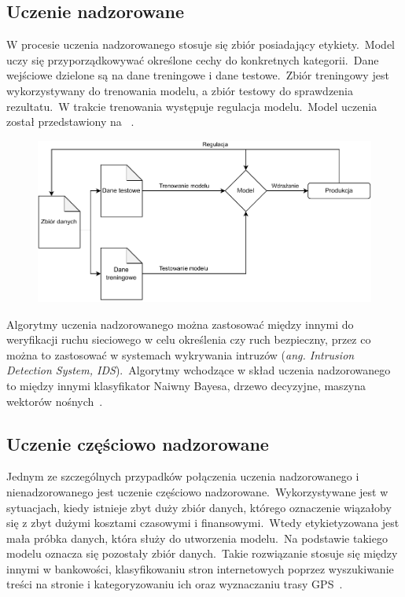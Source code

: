 \subsection{Uczenie nadzorowane}
W procesie uczenia nadzorowanego stosuje się zbiór posiadający etykiety.\ Model uczy się przyporządkowywać określone cechy do konkretnych kategorii.\ Dane wejściowe dzielone są na dane treningowe i dane testowe.\ Zbiór treningowy jest wykorzystywany do trenowania modelu, a zbiór testowy do sprawdzenia rezultatu.\ W trakcie trenowania występuje regulacja modelu.\ Model uczenia został przedstawiony na ~\cite{AiScience, Mahesh2018}.

\begin{figure}[H]
    \centering
    \includegraphics[width=1\textwidth]{images/supervised}
    \label{fig:spervised}
\end{figure}

Algorytmy uczenia nadzorowanego można zastosować między innymi do weryfikacji ruchu sieciowego w celu określenia czy ruch bezpieczny, przez co można to zastosować w systemach wykrywania intruzów (\textit{ang. Intrusion Detection System, IDS}).\ Algorytmy wchodzące w skład uczenia nadzorowanego to między innymi klasyfikator Naiwny Bayesa, drzewo decyzyjne, maszyna wektorów nośnych~\cite{AiScience, Mahesh2018}.

\subsection{Uczenie częściowo nadzorowane}
Jednym ze szczególnych przypadków połączenia uczenia nadzorowanego i nienadzorowanego jest uczenie częściowo nadzorowane.\ Wykorzystywane jest w sytuacjach, kiedy istnieje zbyt duży zbiór danych, którego oznaczenie wiązałoby się z zbyt dużymi kosztami czasowymi i finansowymi.\ Wtedy etykietyzowana jest mała próbka danych, która służy do utworzenia modelu.\ Na podstawie takiego modelu oznacza się pozostały zbiór danych.\ Takie rozwiązanie stosuje się między innymi w bankowości, klasyfikowaniu stron internetowych poprzez wyszukiwanie treści na stronie i kategoryzowaniu ich oraz wyznaczaniu trasy GPS~\cite{semiLinkedin, Mahesh2018}.

